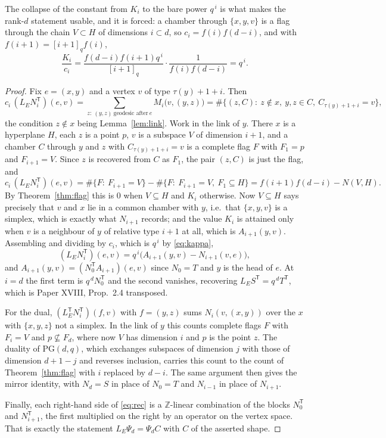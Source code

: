 \documentclass[11pt]{amsart}
\theoremstyle{plain}
\theoremstyle{definition}
\theoremstyle{remark}
\newcommand{\Z}{\mathbb{Z}}
\newcommand{\LE}{L_E}
\newcommand{\PG}{\mathrm{PG}}
\newcommand{\tp}{\mathsf{T}}
\begin{document}
The collapse of the constant from $K_i$ to the bare power $q^{\,i}$ is what makes the
rank-$d$ statement usable, and it is forced: a chamber through $\{x,y,v\}$ is a flag through
the chain $V\subset H$ of dimensions $i\subset d$, so $c_i=f(i)f(d-i)$, and with
$f(i+1)=[i+1]_qf(i)$,
\begin{equation}\label{eq:kappa}
  \frac{K_i}{c_i}
  =\frac{f(d-i)f(i+1)q^{\,i}}{[i+1]_q}\cdot\frac{1}{f(i)f(d-i)}=q^{\,i}.
\end{equation}

\begin{proof}
Fix $e=(x,y)$ and a vertex $v$ of type $\tau(y)+1+i$. Then
\[
  c_i\,(\LE N_i^{\tp})(e,v)=\sum_{z:\ (y,z)\ \text{geodesic after}\ e} M_i\bigl(v,(y,z)\bigr)
  =\#\bigl\{(z,C):\ z\notin x,\ y,z\in C,\ C_{\tau(y)+1+i}=v\bigr\},
\]
the condition $z\notin x$ being Lemma~\ref{lem:link}. Work in the link of $y$. There $x$ is a
hyperplane $H$, each $z$ is a point $p$, $v$ is a subspace $V$ of dimension $i+1$, and a
chamber $C$ through $y$ and $z$ with $C_{\tau(y)+1+i}=v$ is a complete flag $F$ with $F_1=p$
and $F_{i+1}=V$. Since $z$ is recovered from $C$ as $F_1$, the pair $(z,C)$ is just the flag,
and
\[
  c_i\,(\LE N_i^{\tp})(e,v)=\#\{F:\ F_{i+1}=V\}-\#\{F:\ F_{i+1}=V,\ F_1\subseteq H\}
  =f(i+1)f(d-i)-N(V,H).
\]
By Theorem~\ref{thm:flag} this is $0$ when $V\subseteq H$ and $K_i$ otherwise. Now
$V\subseteq H$ says precisely that $v$ and $x$ lie in a common chamber with $y$, i.e.\ that
$\{x,y,v\}$ is a simplex, which is exactly what $N_{i+1}$ records; and the value $K_i$ is
attained only when $v$ is a neighbour of $y$ of relative type $i+1$ at all, which is
$A_{i+1}(y,v)$. Assembling and dividing by $c_i$, which is $q^{\,i}$ by \eqref{eq:kappa},
\[
  (\LE N_i^{\tp})(e,v)=q^{\,i}\bigl(A_{i+1}(y,v)-N_{i+1}(v,e)\bigr),
\]
and $A_{i+1}(y,v)=(N_0^{\tp}A_{i+1})(e,v)$ since $N_0=T$ and $y$ is the head of $e$. At
$i=d$ the first term is $q^{\,d}N_0^{\tp}$ and the second vanishes, recovering
$\LE S^{\tp}=q^{\,d}T^{\tp}$, which is Paper XVIII, Prop.~2.4 transposed.

For the dual, $(\LE^{\tp}N_i^{\tp})(f,v)$ with $f=(y,z)$ sums $N_i(v,(x,y))$ over the $x$ with
$\{x,y,z\}$ not a simplex. In the link of $y$ this counts complete flags $F$ with $F_i=V$ and
$p\not\subseteq F_d$, where now $V$ has dimension $i$ and $p$ is the point $z$. The duality
of $\PG(d,q)$, which exchanges subspaces of dimension $j$ with those of dimension $d+1-j$
and reverses inclusion, carries this count to the count of Theorem~\ref{thm:flag} with $i$
replaced by $d-i$. The same argument then gives the mirror identity, with $N_d=S$ in place of
$N_0=T$ and $N_{i-1}$ in place of $N_{i+1}$.

Finally, each right-hand side of \eqref{eq:rec} is a $\Z$-linear combination of the blocks
$N_0^{\tp}$ and $N_{i+1}^{\tp}$, the first multiplied on the right by an operator on the
vertex space. That is exactly the statement $\LE\Psi_d=\Psi_dC$ with $C$ of the asserted
shape.
\end{proof}
\end{document}
